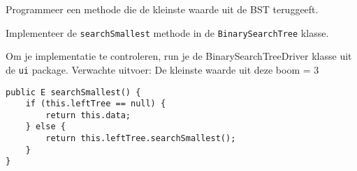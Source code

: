 \begin{oef}
\code Programmeer een methode die de kleinste waarde uit de BST teruggeeft.
\begin{oefenumerate}
	\item Implementeer de \verb=searchSmallest= methode in de \verb=BinarySearchTree= klasse.  
	\item Om je implementatie te controleren, run je de BinarySearchTreeDriver klasse uit de \verb+ui+ package. Verwachte uitvoer: De kleinste waarde uit deze boom = 3
\end{oefenumerate}
\begin{opl}
\begin{lstlisting}[caption={searchSmallest methode}, label=bstsearchsmallest]
public E searchSmallest() {
	if (this.leftTree == null) {
		return this.data;
	} else {
		return this.leftTree.searchSmallest();
	}
}
\end{lstlisting}
\end{opl}
\end{oef}



